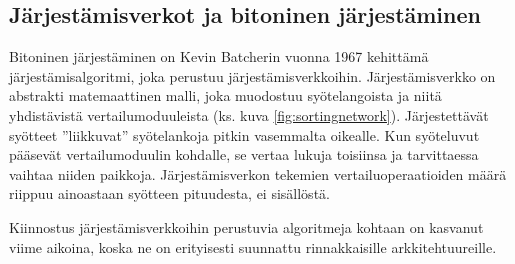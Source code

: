 \documentclass[a4paper,11pt]{article}
\begin{document}
%
%
%
%

\subsection{Järjestämisverkot ja bitoninen järjestäminen}

Bitoninen järjestäminen on Kevin Batcherin vuonna 1967 kehittämä järjestämisalgoritmi, joka perustuu järjestämisverkkoihin. Järjestämisverkko on abstrakti matemaattinen malli, joka muodostuu syötelangoista ja niitä yhdistävistä vertailumoduuleista (ks. kuva \ref{fig:sortingnetwork}). Järjestettävät syötteet ''liikkuvat'' syötelankoja pitkin vasemmalta oikealle. Kun syöteluvut pääsevät vertailumoduulin kohdalle, se vertaa lukuja toisiinsa ja tarvittaessa vaihtaa niiden paikkoja. Järjestämisverkon tekemien vertailuoperaatioiden määrä riippuu ainoastaan syötteen pituudesta, ei sisällöstä.

Kiinnostus järjestämisverkkoihin perustuvia algoritmeja kohtaan on kasvanut viime aikoina, koska ne on erityisesti suunnattu rinnakkaisille arkkitehtuureille.
\end{document}
